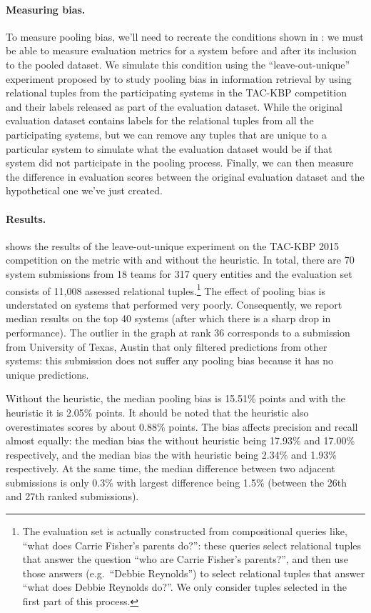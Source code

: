 \paragraph{Measuring bias.}
To measure pooling bias, we'll need to recreate the conditions shown in : we must be able to measure evaluation metrics for a system before and after its inclusion to the pooled dataset. 
We simulate this condition using the ``leave-out-unique'' experiment proposed by \citet{zobel1998reliable} to study pooling bias in information retrieval by using relational tuples from the participating systems in the TAC-KBP competition and their labels released as part of the evaluation dataset.
While the original evaluation dataset contains labels for the relational tuples from all the participating systems, but we can remove any tuples that are unique to a particular system to simulate what the evaluation dataset would be if that system did not participate in the pooling process.
Finally, we can then measure the difference in evaluation scores between the original evaluation dataset and the hypothetical one we've just created.

\paragraph{Results.}
 shows the results of the leave-out-unique experiment on the TAC-KBP 2015 competition on the \fone{} metric with and without the \anydoc{} heuristic.
In total, there are 70 system submissions from 18 teams for 317 query entities and the evaluation set consists of 11,008 assessed relational tuples.\footnote{%
  The evaluation set is actually constructed from compositional queries like, ``what does Carrie Fisher's parents do?'':
  these queries select relational tuples that answer the question ``who are Carrie Fisher's parents?'', and then use those answers (e.g.\ ``Debbie Reynolds'') to select relational tuples that answer ``what does Debbie Reynolds do?''.
  We only consider tuples selected in the first part of this process.
}
The effect of pooling bias is understated on systems that performed very poorly.
Consequently, we report median results on the top 40 systems (after which there is a sharp drop in performance).
The outlier in the graph at rank 36 corresponds to a submission from University of Texas, Austin that only filtered predictions from other systems: this submission does not suffer any pooling bias because it has no unique predictions.

Without the \anydoc{} heuristic, the median pooling bias is 15.51\% \fone{} points and with the heuristic it is 2.05\% \fone{} points.
It should be noted that the \anydoc{} heuristic also overestimates scores by about 0.88\% \fone{} points.
The bias affects precision and recall almost equally: 
  the median bias the without \anydoc{} heuristic being 17.93\% and 17.00\% respectively, and
  the median bias the with \anydoc{} heuristic being 2.34\% and 1.93\% respectively.
At the same time, the median difference between two adjacent submissions is only 0.3\%\fone{} with largest difference being 1.5\% \fone{} (between the 26th and 27th ranked submissions).

